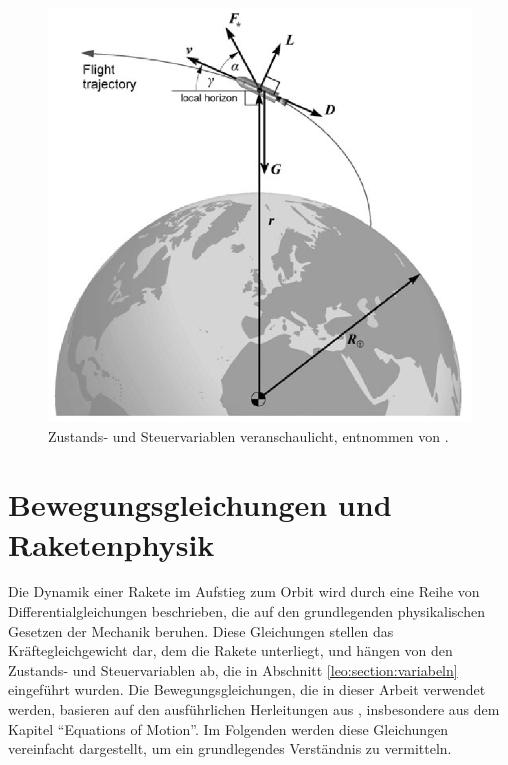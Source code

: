 \begin{figure}
	\centering
	\includegraphics[width=0.65\linewidth]{papers/leo/Grafiken/forces.png}
	\caption{Zustands- und Steuervariablen veranschaulicht, entnommen von \cite{leo:astronautics}.}
	\label{fig:leo:forces}
\end{figure}



\section{Bewegungsgleichungen und Raketenphysik \label{leo:section:beweungsgleichungen}}

Die Dynamik einer Rakete im Aufstieg zum Orbit wird durch eine Reihe von Differentialgleichungen beschrieben, die auf den grundlegenden physikalischen Gesetzen der Mechanik beruhen. 
Diese Gleichungen stellen das Kräftegleichgewicht dar, dem die Rakete unterliegt, und hängen von den Zustands- und Steuervariablen ab, die in Abschnitt \ref{leo:section:variabeln} eingeführt wurden. 
Die Bewegungsgleichungen, die in dieser Arbeit verwendet werden, basieren auf den ausführlichen Herleitungen aus \cite{leo:astronautics}, insbesondere aus dem Kapitel ``Equations of Motion''. 
Im Folgenden werden diese Gleichungen vereinfacht dargestellt, um ein grundlegendes Verständnis zu vermitteln.

